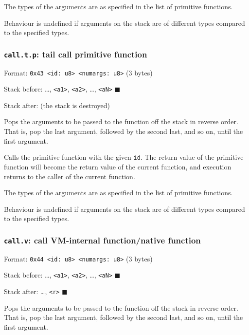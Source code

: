 The types of the arguments are as specified in the list of primitive
functions.

Behaviour is undefined if arguments on the stack are of different types
compared to the specified types.

\subsubsection{\texorpdfstring{\texttt{call.t.p}: tail call primitive
function}{call.t.p: tail call primitive function}}

Format:
\texttt{0x43\ \textless{}id:\ u8\textgreater{}\ \textless{}numargs:\ u8\textgreater{}}
(3 bytes)

Stack before: \ldots, \texttt{\textless{}a1\textgreater{}},
\texttt{\textless{}a2\textgreater{}}, \ldots,
\texttt{\textless{}aN\textgreater{}} \(\blacksquare\)

Stack after: (the stack is destroyed)

Pops the arguments to be passed to the function off the stack in reverse
order. That is, pop the last argument, followed by the second last, and
so on, until the first argument.

Calls the primitive function with the given \texttt{id}. The return
value of the primitive function will become the return value of the
current function, and execution returns to the caller of the current
function.

The types of the arguments are as specified in the list of primitive
functions.

Behaviour is undefined if arguments on the stack are of different types
compared to the specified types.

\subsubsection{\texorpdfstring{\texttt{call.v}: call VM-internal
function/native
function}{call.v: call VM-internal function/native function}}

Format:
\texttt{0x44\ \textless{}id:\ u8\textgreater{}\ \textless{}numargs:\ u8\textgreater{}}
(3 bytes)

Stack before: \ldots, \texttt{\textless{}a1\textgreater{}},
\texttt{\textless{}a2\textgreater{}}, \ldots,
\texttt{\textless{}aN\textgreater{}} \(\blacksquare\)

Stack after: \ldots, \texttt{\textless{}r\textgreater{}}
\(\blacksquare\)

Pops the arguments to be passed to the function off the stack in reverse
order. That is, pop the last argument, followed by the second last, and
so on, until the first argument.

